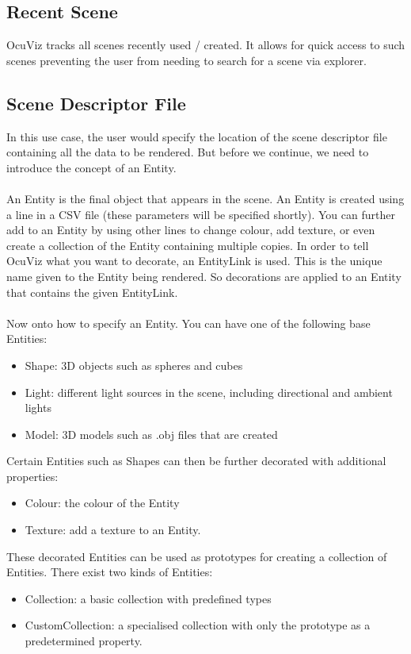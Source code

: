 \documentclass[a4paper,12pt]{article}
\begin{document}
\subsection{Recent Scene}
OcuViz tracks all scenes recently used / created. It allows for quick access to such scenes preventing the user from needing to search for a scene via explorer.

\subsection{Scene Descriptor File}
In this use case, the user would specify the location of the scene descriptor file containing all the data to be rendered. But before we continue, we need to introduce the concept of an Entity. 
\\
\\
An Entity is the final object that appears in the scene. An Entity is created using a line in a CSV file (these parameters will be specified shortly). You can further add to an Entity by using other lines to change colour, add texture, or even create a collection of the Entity containing multiple copies. In order to tell OcuViz what you want to decorate, an EntityLink is used. This is the unique name given to the Entity being rendered. So decorations are applied to an Entity that contains the given EntityLink.
\\
\\
Now onto how to specify an Entity. You can have one of the following base Entities:
\begin{itemize}
\item Shape: 3D objects such as spheres and cubes
\item Light: different light sources in the scene, including directional and ambient lights
\item Model: 3D models such as .obj files that are created
\end{itemize}

Certain Entities such as Shapes can then be further decorated with additional properties:
\begin{itemize}
\item Colour: the colour of the Entity
\item Texture: add a texture to an Entity.
\end{itemize}

These decorated Entities can be used as prototypes for creating a collection of Entities. There exist two kinds of Entities:
\begin{itemize}
\item Collection: a basic collection with predefined types
\item CustomCollection: a specialised collection with only the prototype as a predetermined property.
\end{itemize}
\end{document}
